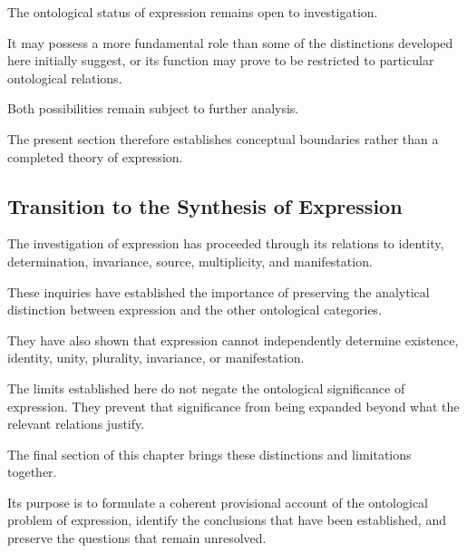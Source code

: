 The ontological status of expression remains
open to investigation.

It may possess a more fundamental role than
some of the distinctions developed here initially
suggest, or its function may prove to be restricted
to particular ontological relations.

Both possibilities remain subject to further
analysis.

The present section therefore establishes
conceptual boundaries rather than a completed
theory of expression.

\subsection{Transition to the Synthesis of Expression}

The investigation of expression has proceeded
through its relations to identity, determination,
invariance, source, multiplicity, and manifestation.

These inquiries have established the importance
of preserving the analytical distinction between
expression and the other ontological categories.

They have also shown that expression cannot
independently determine existence, identity,
unity, plurality, invariance, or manifestation.

The limits established here do not negate the
ontological significance of expression. They
prevent that significance from being expanded
beyond what the relevant relations justify.

The final section of this chapter brings these
distinctions and limitations together.

Its purpose is to formulate a coherent provisional
account of the ontological problem of expression,
identify the conclusions that have been established,
and preserve the questions that remain unresolved.

